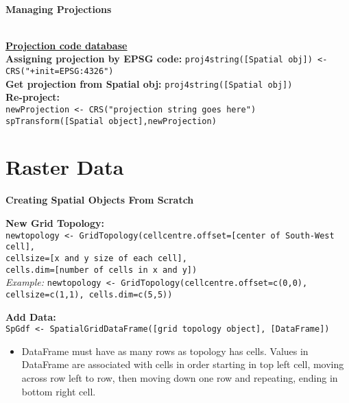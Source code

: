 \documentclass[10pt]{article}
\begin{document}

\hrulefill \\ 
\centerline{\textbf{Managing Projections}} \\
\href{http://www.spatialreference.org/}{\underline{\textbf{Projection code database}}} \\
\hspace{0.3cm}
\textbf{Assigning projection by EPSG code:} \texttt{proj4string([Spatial obj]) <-CRS("+init=EPSG:4326")}\\
\textbf{Get projection from Spatial obj:} \texttt{proj4string([Spatial obj])} \\
\textbf{Re-project:} \\
\hspace*{0.3cm}\texttt{newProjection <- CRS("projection string goes here")}\\
\hspace*{0.3cm}\texttt{spTransform([Spatial object],newProjection)}\\
\section*{Raster Data}



\centerline{\textbf{Creating Spatial Objects From Scratch}} 

\textbf{New Grid Topology:} \\
\texttt{newtopology <- GridTopology(cellcentre.offset=[center of South-West cell], \\
\hspace*{4cm} cellsize=[x and y size of each cell], \\
\hspace*{4cm} cells.dim=[number of cells in x and y])} \\
\emph{Example:} \texttt{newtopology <- GridTopology(cellcentre.offset=c(0,0), cellsize=c(1,1), cells.dim=c(5,5))} 

\textbf{Add Data:} \\
\texttt{SpGdf <- SpatialGridDataFrame([grid topology object], [DataFrame])}
\begin{itemize}
	\item DataFrame must have as many rows as topology has cells. Values in DataFrame are associated with cells in order starting in top left cell, moving across row left to row, then moving down one row and repeating, ending in bottom right cell. 
\end{itemize}
\end{document}
